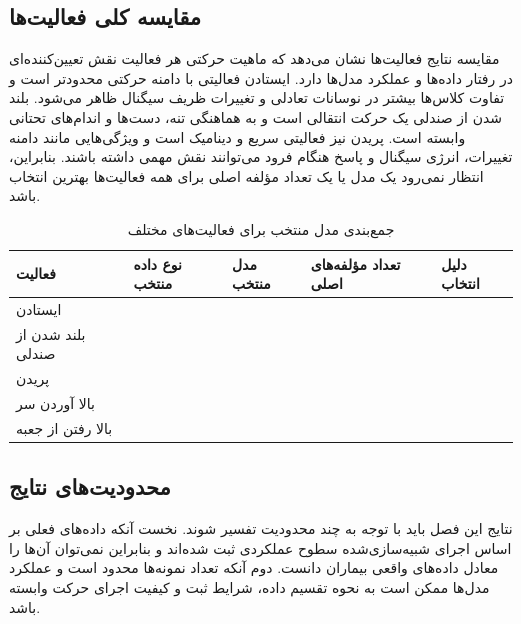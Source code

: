 %

%

%

\subsection{مقایسه کلی فعالیت‌ها}

مقایسه نتایج فعالیت‌ها نشان می‌دهد که ماهیت حرکتی هر فعالیت نقش تعیین‌کننده‌ای در رفتار داده‌ها و عملکرد مدل‌ها دارد. ایستادن فعالیتی با دامنه حرکتی محدودتر است و تفاوت کلاس‌ها بیشتر در نوسانات تعادلی و تغییرات ظریف سیگنال ظاهر می‌شود. بلند شدن از صندلی یک حرکت انتقالی است و به هماهنگی تنه، دست‌ها و اندام‌های تحتانی وابسته است. پریدن نیز فعالیتی سریع و دینامیک است و ویژگی‌هایی مانند دامنه تغییرات، انرژی سیگنال و پاسخ هنگام فرود می‌توانند نقش مهمی داشته باشند. بنابراین، انتظار نمی‌رود یک مدل یا یک تعداد مؤلفه اصلی برای همه فعالیت‌ها بهترین انتخاب باشد.

\begin{table}[H]
	\centering
	\caption{جمع‌بندی مدل منتخب برای فعالیت‌های مختلف}
	\label{tab:chapter4_selected_models}
	\begin{tabular}{p{3.2cm}p{3cm}p{3cm}p{2.6cm}p{3cm}}
		\toprule
		فعالیت & نوع داده منتخب & مدل منتخب & تعداد مؤلفه‌های اصلی & دلیل انتخاب \\
		\midrule
		ایستادن &  &  &  &  \\
		بلند شدن از صندلی &  &  &  &  \\
		پریدن &  &  &  &  \\
		بالا آوردن سر &  &  &  &  \\
		بالا رفتن از جعبه &  &  &  &  \\
		\bottomrule
	\end{tabular}
\end{table}

\subsection{محدودیت‌های نتایج}

نتایج این فصل باید با توجه به چند محدودیت تفسیر شوند. نخست آنکه داده‌های فعلی بر اساس اجرای شبیه‌سازی‌شده سطوح عملکردی ثبت شده‌اند و بنابراین نمی‌توان آن‌ها را معادل داده‌های واقعی بیماران دانست. دوم آنکه تعداد نمونه‌ها محدود است و عملکرد مدل‌ها ممکن است به نحوه تقسیم داده، شرایط ثبت و کیفیت اجرای حرکت وابسته باشد.

